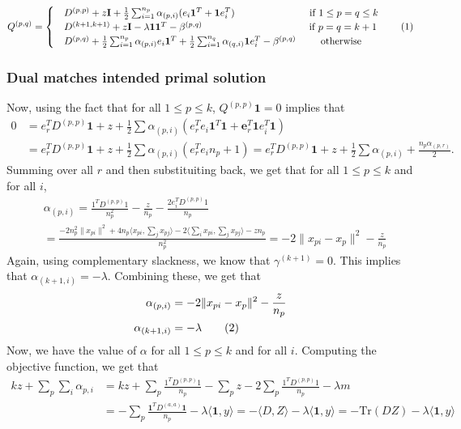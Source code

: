 \documentclass[12pt]{article}
\newcommand{\mb}{\mathbf}
\newcommand{\tr}{\text{Tr}}
\newcommand\numberthis{\addtocounter{equation}{1}\tag{\theequation}}
\begin{document}
\begin{alignat*}{1}
  Q^{(p, q)} = 
  \begin{cases}
    &D^{(p,p)} + z \mb I + \frac{1}{2}\sum_{i=1}^{n_p} \alpha_{(p,i)} (e_{i}\mb 1^T + \mb 1e_{i}^T) \hspace{1in}\text{ if } 1 \le p = q \le k\\
    &D^{(k+1,k+1)} + z\mb I - \lambda \mb 1 \mb 1^T - \beta^{(p,q)} \hspace{1.45in}\text{ if } p = q = k+1\\
    &D^{(p,q)} + \frac{1}{2}\sum_{i=1}^{n_p} \alpha_{(p,i)} e_{i}\mb 1^T + \frac{1}{2}\sum_{i=1}^{n_q}\alpha_{(q,i)}\mb 1e_{i}^T - \beta^{(p,q)} \hspace{0.3in}\text{ otherwise }
  \end{cases}
  \label{a-eqn:resularisedQ}\numberthis
\end{alignat*} 

\subsubsection*{Dual matches intended primal solution}
Now, using the fact that for all $1\le p \le k$, $Q^{(p, p)}\mb 1 = 0$ implies that
\begin{align*}
  0 &= e_r^TD^{(p,p)}\mb1 + z + \frac{1}{2}\sum\alpha_{(p,i)} (e_r^Te_{i}\mb 1^T\mb1 + \mb e_r^T\mb1e_{i}^T\mb1)\\
  & = e_r^TD^{(p,p)}\mb1 + z + \frac{1}{2}\sum\alpha_{(p,i)} (e_r^Te_{i}n_p + 1) = e_r^TD^{(p,p)}\mb1 + z + \frac{1}{2}\sum\alpha_{(p,i)} +\frac{n_p\alpha_{(p,r)}}{2}.
\end{align*}
Summing over all $r$ and then substituiting back, we get that for all $1\le p \le k$ and for all $i$,  
\begin{align*}
  &\alpha_{(p, i)} = \frac{1^TD^{(p,p)}1}{n_p^2}-\frac{z}{n_p} -\frac{2e_i^TD^{(p,p)}1}{n_p} \\
  &= \frac{-2n_p^2 \|x_{pi}\|^2 + 4n_p \langle x_{pi}, \sum_jx_{pj}\rangle - 2\langle \sum_i x_{pi}, \sum_j x_{pj}\rangle -zn_p}{n_p^2} = -2\|x_{pi} - x_p\|^2-\frac{z}{n_p}
\end{align*}
Again, using complementary slackness, we know that $\gamma^{(k+1)} = 0$. This implies that $\alpha_{(k+1, i)} = -\lambda$. Combining these, we get that
\begin{align*}
  \alpha_{(p, i)} &= -2\|x_{pi} - x_p\|^2-\frac{z}{n_p} \\
  \alpha_{(k+1, i)} &= -\lambda \numberthis\label{a-eqn:regularizedAlpha} 
\end{align*}
Now, we have the value of $\alpha$ for all $1\le p \le k$ and for all $i$. Computing the objective function, we get that 
\begin{align*}
  kz + \sum_p\sum_i \alpha_{p,i} &= kz + \sum_{p}\frac{1^TD^{(p, p)}1}{n_p} - \sum_p z -2\sum_p \frac{1^TD^{(p,p)}1}{n_p} - \lambda m \\
  &= -\sum_p \frac{\mb1^TD^{(a,a)}\mb1}{n_p} - \lambda \langle \mb 1, y\rangle = -\langle D, Z \rangle - \lambda \langle \mb 1, y\rangle = - \tr(DZ) - \lambda \langle \mb 1, y\rangle
\end{align*}
\end{document}
